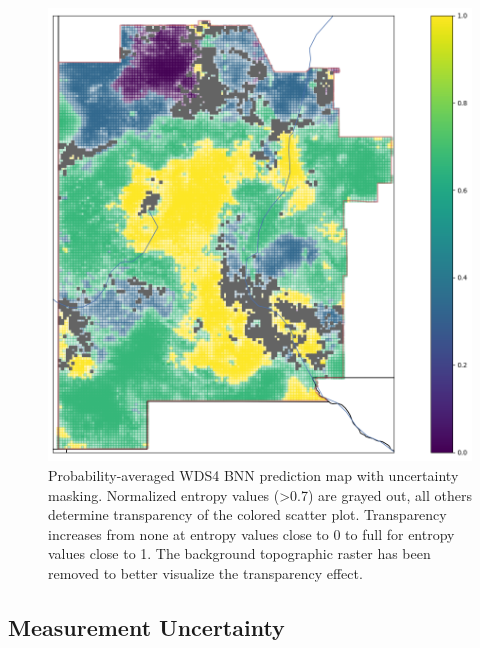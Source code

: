 \begin{figure}[!htp]
\centering
\includegraphics[width=.8\textwidth]{templates/images/Figure-BNN_All_Gradient_Map_Masked_whitebackground.png}
\caption[Parameter uncertainty mask on BNN prediction map]
{Probability-averaged WDS4 BNN prediction map with uncertainty masking. Normalized entropy values (>0.7) are grayed out, all others determine transparency of the colored scatter plot. Transparency increases from none at entropy values close to 0 to full for entropy values close to 1. The background topographic raster has been removed to better visualize the transparency effect.}
\label{fig:bnn_masked_pred_map}
\end{figure}

\subsection{Measurement Uncertainty}\label{ch5:measure_uncertainty}

